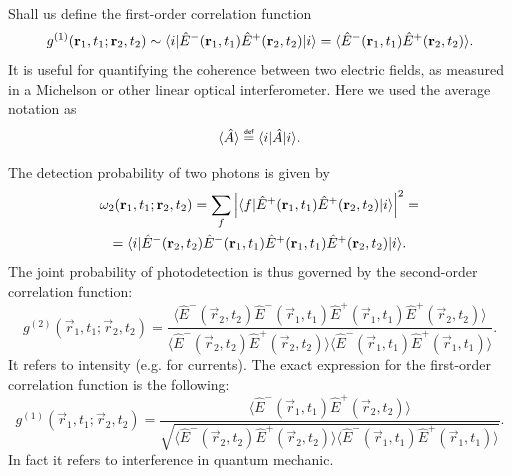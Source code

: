 Shall us define the first-order correlation function
\begin{equation}
	g^{(1)} (\mathbf{r}_1,t_1; \mathbf{r}_2, t_2) \sim \langle i\rvert \hat{E}^-(\mathbf{r}_1, t_1) \hat{E}^+ (\mathbf{r}_2, t_2) \lvert i\rangle = \langle \hat{E}^-(\mathbf{r}_1, t_1) \hat{E}^+ (\mathbf{r}_2, t_2) \rangle.
\end{equation}
It is useful for quantifying the coherence between two electric fields, as measured in a Michelson or other linear optical interferometer. Here we used the average notation as 
\begin{equation}
	\langle \hat{A} \rangle \myeq \bra{i} \hat{A} \ket{i}.
\end{equation}

The detection probability of two photons is given by
\begin{multline}
	\omega_2 (\mathbf{r}_1, t_1; \mathbf{r}_2, t_2) = \sum_{f} \left| \langle f\rvert \hat{E}^+ (\mathbf{r}_1 ,t_1) \hat{E}^+ (\mathbf{r}_2 , t_2) \lvert i\rangle \right|^2 = \\ = \langle i\rvert \hat{E}^- (\mathbf{r}_2 , t_2) \hat{E}^- (\mathbf{r}_1 , t_1) \hat{E}^+ (\mathbf{r}_1 , t_1) \hat{E}^+ (\mathbf{r}_2 , t_2) \lvert i\rangle.
\end{multline}
The joint probability of photodetection is thus governed by the second-order correlation function:
\begin{equation}
	g^{(2)}(\vec{r}_1, t_1; \vec{r}_2, t_2) = \frac{\langle \hat{E}^-(\vec{r}_2, t_2) \hat{E}^-(\vec{r}_1, t_1) \hat{E}^+(\vec{r}_1, t_1) \hat{E}^+(\vec{r}_2, t_2)\rangle}{\langle \hat{E}^-(\vec{r}_2, t_2) \hat{E}^+(\vec{r}_2, t_2) \rangle \langle \hat{E}^-(\vec{r}_1, t_1) \hat{E}^+(\vec{r}_1, t_1) \rangle}.
\end{equation}
It refers to intensity (e.g. for currents). The exact expression for the first-order correlation function is the following:
\begin{equation}
	g^{(1)} (\vec{r}_1, t_1; \vec{r}_2, t_2) = \frac{\langle \hat{E}^-(\vec{r}_1, t_1) \hat{E}^+ (\vec{r}_2, t_2) \rangle}{\sqrt{\langle \hat{E}^-(\vec{r}_2, t_2) \hat{E}^+(\vec{r}_2, t_2) \rangle \langle \hat{E}^-(\vec{r}_1, t_1) \hat{E}^+(\vec{r}_1, t_1) \rangle}}.
\end{equation}
In fact it refers to interference in quantum mechanic.

